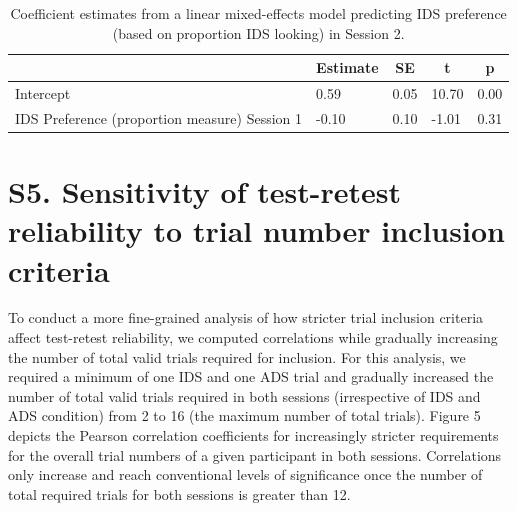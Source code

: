 \documentclass[
  man, donotrepeattitle,floatsintext]{apa6}
\begin{document}
\begin{table}[tbp]

\begin{center}
\begin{threeparttable}

\caption{\label{tab:unnamed-chunk-11}Coefficient estimates from a linear mixed-effects model predicting IDS preference (based on proportion IDS looking) in Session 2.}

\begin{tabular}{lllll}
\toprule
 & \multicolumn{1}{c}{Estimate} & \multicolumn{1}{c}{SE} & \multicolumn{1}{c}{t} & \multicolumn{1}{c}{p}\\
\midrule
Intercept & 0.59 & 0.05 & 10.70 & 0.00\\
IDS Preference (proportion measure) Session 1 & -0.10 & 0.10 & -1.01 & 0.31\\
\bottomrule
\end{tabular}

\end{threeparttable}
\end{center}

\end{table}

\newpage

\hypertarget{s5.-sensitivity-of-test-retest-reliability-to-trial-number-inclusion-criteria}{%
\section{S5. Sensitivity of test-retest reliability to trial number inclusion criteria}\label{s5.-sensitivity-of-test-retest-reliability-to-trial-number-inclusion-criteria}}

To conduct a more fine-grained analysis of how stricter trial inclusion criteria affect test-retest reliability, we computed correlations while gradually increasing the number of total valid trials required for inclusion.
For this analysis, we required a minimum of one IDS and one ADS trial and gradually increased the number of total valid trials required in both sessions (irrespective of IDS and ADS condition) from 2 to 16 (the maximum number of total trials).
Figure 5 depicts the Pearson correlation coefficients for increasingly stricter requirements for the overall trial numbers of a given participant in both sessions.
Correlations only increase and reach conventional levels of significance once the number of total required trials for both sessions is greater than 12.
\end{document}
